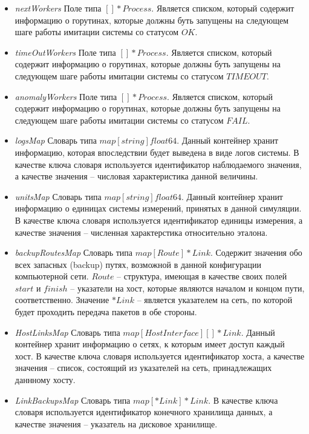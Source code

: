 \begin{itemize}
\item \textit{nextWorkers}
Поле типа $[]*Process$. Является списком, который содержит информацию о горутинах, которые должны буть запущены на следующем шаге работы имитации системы со статусом $OK$.

\item \textit{timeOutWorkers}   
Поле типа $[]*Process$. Является списком, который содержит информацию о горутинах, которые должны буть запущены на следующем шаге работы имитации системы со статусом $TIMEOUT$.

\item \textit{anomalyWorkers}   
Поле типа $[]*Process$. Является списком, который содержит информацию о горутинах, которые должны буть запущены на следующем шаге работы имитации системы со статусом $FAIL$.

\item \textit{logsMap}  
Словарь типа $map[string]float64$. Данный контейнер хранит информацию, которая впоследствии будет выведена в виде логов системы.  В качестве ключа словаря используется идентификатор наблюдаемого значения, а качестве значения -- числовая характеристика данной величины.

\item \textit{unitsMap} 
Словарь типа $map[string]float64$. Данный контейнер хранит информацию о единицах системы измерений, принятых в данной симуляции. В качестве ключа словаря используется идентификатор единицы измерения, а качестве значения -- численная характерстика относительно эталона.

\item \textit{backupRoutesMap} 
Словарь типа  $map[Route]*Link$. Содержит значения обо всех запасных (backup) путях, возможной в данной конфигурации компьютерной сети. $Route$ -- структура, имеющая в качестве своих полей $start$ и $finish$ -- указатели на хост, которые являются началом и концом пути, соответственно. Значение $*Link$ -- является указателем на сеть, по которой будет проходить передача пакетов в обе стороны.

\item \textit{HostLinksMap}
Словарь типа $map[HostInterface][]*Link$. Данный контейнер хранит информацию о сетях, к которым имеет доступ каждый хост. В качестве ключа словаря используется идентификатор хоста, а качестве значения -- список, состоящий из указателей на сеть, принадлежащих даннному хосту.

\item \textit{LinkBackupsMap}  
Словарь типа $map[*Link]*Link$.  В качестве ключа словаря используется идентификатор конечного хранилища данных, а качестве значения -- указатель на дисковое хранилище.
\end{itemize}

